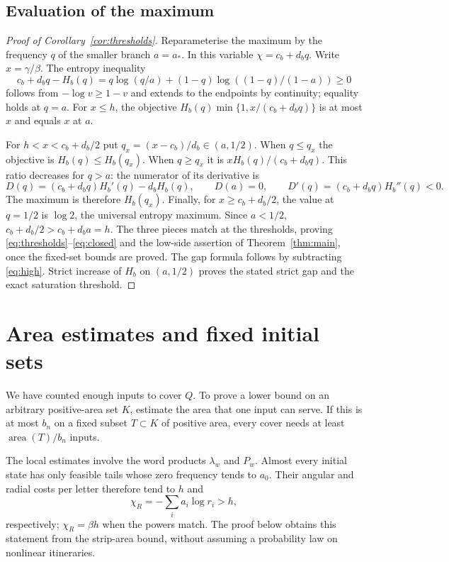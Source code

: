 \documentclass[11pt]{amsart}
\theoremstyle{definition}
\theoremstyle{remark}
\newcommand{\area}{\operatorname{area}}
\numberwithin{equation}{section}
\begin{document}
\subsection{Evaluation of the maximum}
\begin{proof}[Proof of Corollary~\ref{cor:thresholds}]
Reparameterise the maximum by the frequency $q$ of the smaller
branch $a=a_*$. In this variable $\chi=c_b+d_bq$.
Write $x=\gamma/\beta$. The entropy inequality
\[
c_b+d_bq-H_b(q)=
q\log(q/a)+(1-q)\log((1-q)/(1-a))\ge0
\]
follows from $-\log v\ge1-v$ and extends to the endpoints
by continuity; equality holds at $q=a$.
For $x\le h$, the objective
$H_b(q)\min\{1,x/(c_b+d_bq)\}$ is at most $x$
and equals $x$ at $a$.

For $h<x<c_b+d_b/2$ put $q_x=(x-c_b)/d_b\in(a,1/2)$.
When $q\le q_x$ the objective is $H_b(q)\le H_b(q_x)$.
When $q\ge q_x$ it is $xH_b(q)/(c_b+d_bq)$.
This ratio decreases for $q>a$: the numerator of its
derivative is
\[
D(q)=(c_b+d_bq)H_b'(q)-d_bH_b(q),\qquad
D(a)=0,\qquad D'(q)=(c_b+d_bq)H_b''(q)<0.
\]
The maximum is therefore $H_b(q_x)$.
Finally, for $x\ge c_b+d_b/2$, the value at $q=1/2$ is
$\log2$, the universal entropy maximum.
Since $a<1/2$, $c_b+d_b/2>c_b+d_ba=h$.
The three pieces match at the thresholds, proving
\eqref{eq:thresholds}--\eqref{eq:closed} and the low-side assertion
of Theorem~\ref{thm:main}, once the fixed-set bounds are proved.
The gap formula follows by subtracting \eqref{eq:high}.
Strict increase of $H_b$ on $(a,1/2)$ proves the stated
strict gap and the exact saturation threshold.
\end{proof}

\section{Area estimates and fixed initial sets}\label{sec:area}
We have counted enough inputs to cover $Q$. To prove a lower
bound on an arbitrary positive-area set $K$, estimate the area
that one input can serve. If this is at most $b_n$ on a fixed
subset $T\subset K$ of positive area, every cover needs at least
$\area(T)/b_n$ inputs.

The local estimates involve the word products $\lambda_w$ and
$P_w$. Almost every initial state has only feasible tails whose
zero frequency tends to $a_0$. Their angular and radial costs per
letter therefore tend to $h$ and
\begin{equation}\label{eq:radialparameters}
\chi_R=-\sum_i a_i\log r_i>h,
\end{equation}
respectively; $\chi_R=\beta h$ when the powers match.
The proof below obtains this statement from the strip-area bound,
without assuming a probability law on nonlinear itineraries.
\end{document}
